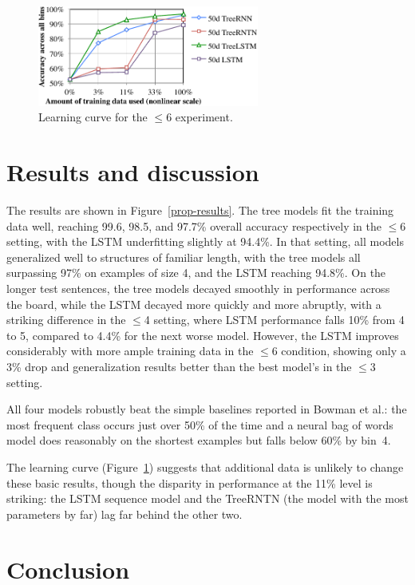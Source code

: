 \begin{figure}[t]
  \centering
      \includegraphics[height=1.3in]{lcc.pdf}
  \caption{Learning curve for the $\le$6 experiment.}
  \label{fig:lc} 
\end{figure}

\section{Results and discussion}\label{sec:discussion}

The results are shown in Figure~\ref{prop-results}. 
The tree models fit the training data well, reaching 99.6, 98.5, and 97.7\% overall accuracy respectively in the $\le$6 setting, with the LSTM underfitting slightly at 94.4\%. 
In that setting, all models generalized well to structures of familiar length, with the tree models all surpassing 97\% on examples of size 4, and the LSTM reaching 94.8\%.
On the longer test sentences, the tree models decayed smoothly in performance across the board, while the LSTM decayed more quickly and more abruptly, with a striking difference in the $\le$4 setting, where LSTM performance falls 10\% from 4 to 5, compared to 4.4\% for the next worse model. However, the LSTM improves considerably with more ample training data in the $\le$6 condition, showing only a 3\% drop and generalization results better than the best model's in the $\le$3 setting.  %

All four models robustly beat the simple baselines reported in Bowman et al.: the most frequent class occurs just over 50\% of the time and a neural bag of words model does reasonably on the shortest examples but falls below 60\% by bin~4.

The learning curve (Figure~\ref{fig:lc}) suggests that additional data is unlikely to change these basic results, though the disparity in performance at the 11\% level is striking: the LSTM sequence model and the TreeRNTN (the model with the most parameters by far) lag far behind the other two.

\section{Conclusion}

